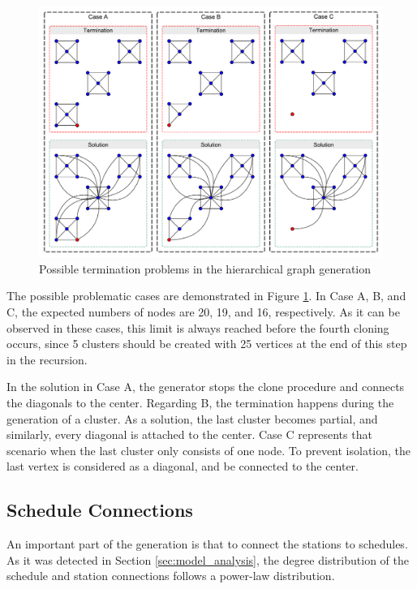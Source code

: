 \begin{figure}[!ht]
	\centering
	\includegraphics[width=150mm, keepaspectratio]{figures/hierarchical.pdf}
	\caption{Possible termination problems in the hierarchical graph generation}
	\label{fig:hierarchical_problems}
\end{figure}

The possible problematic cases are demonstrated in Figure \ref{fig:hierarchical_problems}. In \textsf{Case A}, \textsf{B}, and \textsf{C}, the expected numbers of nodes are 20, 19, and 16, respectively. As it can be observed in these cases, this limit is always reached before the fourth cloning occurs, since 5 clusters should be created with 25 vertices at the end of this step in the recursion.

In the solution in \textsf{Case A}, the generator stops the clone procedure and connects the diagonals to the center. Regarding \textsf{B}, the termination happens during the generation of a cluster. As a solution, the last cluster becomes partial, and similarly, every diagonal is attached to the center. \textsf{Case C} represents that scenario when the last cluster only consists of one node. To prevent isolation, the last vertex is considered as a diagonal, and be connected to the center.

\subsection{Schedule Connections}\label{sec:schedule_connections}

An important part of the generation is that to connect the stations to schedules. As it was detected in Section \ref{sec:model_analysis}, the degree distribution of the schedule and station connections follows a power-law distribution. %


